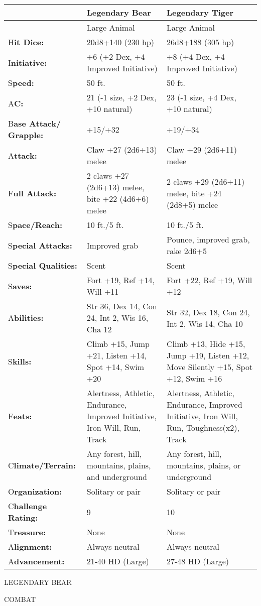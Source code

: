 \documentclass{article}
\begin{document}
{\begin{tabular}{|>{\raggedright}p{60pt}|>{\raggedright}p{126pt}|>{\raggedright}p{126pt}|}
\hline
  & L\textbf{egendary Bear } & L\textbf{egendary Tiger }\tabularnewline
\hline
  & Large Animal  & Large Animal \tabularnewline
\hline
H\textbf{it Dice:}  & 20d8+140 (230 hp)  & 26d8+188 (305 hp) \tabularnewline
\hline
I\textbf{nitiative:}  & +6 (+2 Dex, +4 Improved Initiative)  & +8 (+4 Dex, +4 Improved 
Initiative) \tabularnewline
\hline
S\textbf{peed:}  & 50 ft.  & 50 ft. \tabularnewline
\hline
A\textbf{C:}  & 21 (-1 size, +2 Dex, +10 natural)  & 23 (-1 size, +4 Dex, +10 natural) 
\tabularnewline
\hline
B\textbf{ase Attack/}\linebreak{}
\textbf{Grapple:} & +15/+32 & +19/+34\tabularnewline
\hline
A\textbf{ttack:} & Claw +27 (2d6+13) melee & Claw +29 (2d6+11) melee\tabularnewline
\hline
F\textbf{ull Attack:} & 2 claws +27 (2d6+13) melee, bite +22 (4d6+6) melee & 2 
claws +29 (2d6+11) melee, bite +24 (2d8+5) melee\tabularnewline
\hline
S\textbf{pace/Reach:}  & 10 ft./5 ft.  & 10 ft./5 ft. \tabularnewline
\hline
S\textbf{pecial Attacks:}  & Improved grab  & Pounce, improved grab, rake 2d6+5 
\tabularnewline
\hline
S\textbf{pecial Qualities:}  & Scent  & Scent \tabularnewline
\hline
S\textbf{aves:}  & Fort +19, Ref +14, Will +11  & Fort +22, Ref +19, Will +12 \tabularnewline
\hline
A\textbf{bilities:}  & Str 36, Dex 14, Con 24, Int 2, Wis 16, Cha 12  & Str 32, 
Dex 18, Con 24, Int 2, Wis 14, Cha 10 \tabularnewline
\hline
S\textbf{kills:}  & Climb +15, Jump +21, Listen +14, Spot +14, Swim +20 & Climb 
+13, Hide +15, Jump +19, Listen +12, Move Silently +15, Spot +12, Swim +16\tabularnewline
\hline
F\textbf{eats: } & Alertness, Athletic, Endurance, Improved Initiative, Iron Will, 
Run, Track & Alertness, Athletic, Endurance, Improved Initiative, Iron Will, Run, 
Toughness(x2), Track\tabularnewline
\hline
C\textbf{limate/Terrain:}  & Any forest, hill, mountains, plains, and underground 
 & Any forest, hill, mountains, plains, or underground \tabularnewline
\hline
O\textbf{rganization:}  & Solitary or pair  & Solitary or pair \tabularnewline
\hline
C\textbf{hallenge Rating:}  & 9  & 10 \tabularnewline
\hline
T\textbf{reasure: } & None  & None \tabularnewline
\hline
A\textbf{lignment:}  & Always neutral  & Always neutral \tabularnewline
\hline
A\textbf{dvancement:}  & 21-40 HD (Large)  & 27-48 HD (Large) \tabularnewline
\hline
\end{tabular}

LEGENDARY BEAR 

COMBAT 

}
\end{document}
